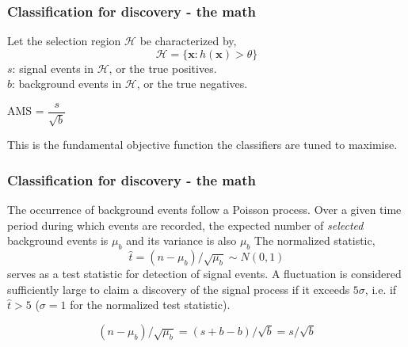 \documentclass[pdf]{beamer}
\begin{document}
\begin{frame}
\frametitle{Classification for discovery - the math} 
Let the selection region $\mathcal{H}$ be characterized by,
\begin{equation}
\mathcal{H} = \{\textbf{x} : h(\textbf{x}) > \theta \}
\end{equation}
$s$: signal events in $\mathcal{H}$, or the true positives.\\
$b$: background events in $\mathcal{H}$, or the true negatives.\\
\begin{center}
AMS = $\dfrac{s}{\sqrt{b}}$ 
\end{center}
This is the fundamental objective function the classifiers are tuned to maximise. 
\end{frame}

\begin{frame}
\frametitle{Classification for discovery - the math}

The occurrence of background events follow a Poisson process. 
Over a given time period during which events are recorded, the expected number of \textit{selected} background events is $\mu_{b}$ and its variance is also $\mu_{b}$ 
The normalized statistic, 
\begin{equation} \hat{t} = (n-\mu_{b})/\sqrt{\mu_{b}} \sim N(0,1) 
\end{equation} serves as a test statistic for detection of signal events. A fluctuation is considered sufficiently large to claim a discovery of the signal process if it exceeds $5\sigma$, i.e. if $\hat{t} > 5$ ($\sigma = 1$ for the normalized test statistic).

\begin{equation}
(n-\mu_{b})/\sqrt{\mu_{b}} = ( s + b - b)/\sqrt{b} = s/\sqrt{b}
\end{equation}

\end{frame}
\end{document}
